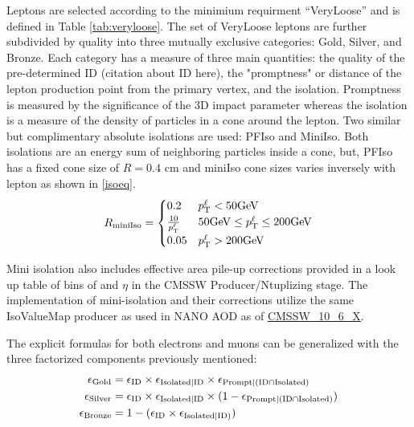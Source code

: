 Leptons are selected according to the minimium requirment ``VeryLoose'' and is defined in Table \ref{tab:veryloose}.  The set of VeryLoose leptons are further subdivided by quality into three mutually exclusive categories: Gold, Silver, and Bronze. Each category has a measure of three main quantities: the quality of the pre-determined ID (citation about ID here), the "promptness" or distance of the lepton production point from the primary vertex, and the isolation. Promptness is measured by the significance of the 3D impact parameter whereas the isolation is a measure of the density of particles in a cone around the lepton. Two similar but complimentary absolute isolations are used: PFIso and MiniIso. Both isolations are an energy sum of neighboring particles inside a cone, but, PFIso has a fixed cone size of $R=0.4$ cm  and miniIso cone sizes varies inversely with lepton \pt as shown in \ref{isoeq}.
\begin{equation}
\label{isoeq}
R_{\text{miniIso}}=
    \begin{cases}
      0.2 & p_{\mathrm{T}}^\ell < 50 \text{GeV}\\
      \frac{10}{p_{\mathrm{T}}^\ell} & 50 \text{GeV} \leq p_{\mathrm{T}}^\ell \leq 200 \text{GeV} \\
      0.05 & p_{\mathrm{T}}^\ell > 200 \text{GeV}
    \end{cases}
\end{equation}

Mini isolation also includes effective area pile-up corrections provided in a look up table of bins of \pt and $\eta$ in the CMSSW Producer/Ntuplizing stage. The implementation of mini-isolation and their corrections utilize the same IsoValueMap producer as used in NANO AOD as of \url{CMSSW_10_6_X}.


The explicit formulas for both electrons and muons can be generalized with the three factorized components previously mentioned:
\begin{equation}\label{eq:efflep_general}
\begin{split}
\epsilon_{\text{Gold}}& = \epsilon_{\text{ID}}\times \epsilon_{\text{Isolated}|\text{ID}} \times \epsilon_{\text{Prompt}|(\text{ID} \cap \text{Isolated})} \\
\epsilon_{\text{Silver}}& = \epsilon_{\text{ID}} \times \epsilon_{\text{Isolated}|\text{ID}} \times (1-\epsilon_{\text{Prompt}|(\text{ID} \cap \text{Isolated})}) \\
\epsilon_{\text{Bronze}}& = 1-(\epsilon_{\text{ID}} \times \epsilon_{\text{Isolated}|\text{ID})} )
\end{split}
\end{equation}


